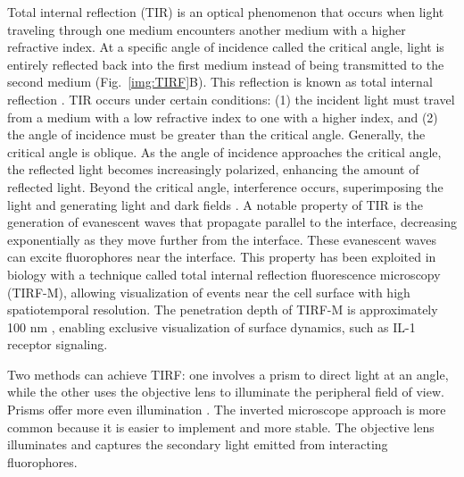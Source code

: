 Total internal reflection (TIR) is an optical phenomenon that occurs when light traveling through one medium encounters another medium with a higher refractive index. At a specific angle of incidence called the critical angle, light is entirely reflected back into the first medium instead of being transmitted to the second medium (Fig.~\ref{img:TIRF}B). This reflection is known as total internal reflection \autocite{Axelrod_1984}. TIR occurs under certain conditions: (1) the incident light must travel from a medium with a low refractive index to one with a higher index, and (2) the angle of incidence must be greater than the critical angle. Generally, the critical angle is oblique. As the angle of incidence approaches the critical angle, the reflected light becomes increasingly polarized, enhancing the amount of reflected light. Beyond the critical angle, interference occurs, superimposing the light and generating light and dark fields \autocite{Axelrod_1989}\autocite{Axelrod_2008}. A notable property of TIR is the generation of evanescent waves that propagate parallel to the interface, decreasing exponentially as they move further from the interface. These evanescent waves can excite fluorophores near the interface. This property has been exploited in biology with a technique called total internal reflection fluorescence microscopy (TIRF-M), allowing visualization of events near the cell surface with high spatiotemporal resolution. The penetration depth of TIRF-M is approximately 100 nm \autocite{Fish_2022}, enabling exclusive visualization of surface dynamics, such as IL-1 receptor signaling.
 
Two methods can achieve TIRF: one involves a prism to direct light at an angle, while the other uses the objective lens to illuminate the peripheral field of view. Prisms offer more even illumination \autocite{Fish_2022}. The inverted microscope approach is more common because it is easier to implement and more stable. The objective lens illuminates and captures the secondary light emitted from interacting fluorophores.
 
